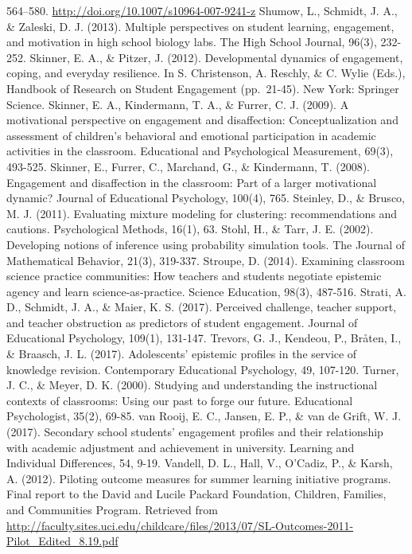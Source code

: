 \documentclass[]{msu-thesis}
\theoremstyle{definition}
\theoremstyle{definition}
\theoremstyle{definition}
\theoremstyle{remark}
\begin{document}
564--580. \url{http://doi.org/10.1007/s10964-007-9241-z} Shumow, L.,
Schmidt, J. A., \& Zaleski, D. J. (2013). Multiple perspectives on
student learning, engagement, and motivation in high school biology
labs. The High School Journal, 96(3), 232-252. Skinner, E. A., \&
Pitzer, J. (2012). Developmental dynamics of engagement, coping, and
everyday resilience. In S. Christenson, A. Reschly, \& C. Wylie (Eds.),
Handbook of Research on Student Engagement (pp.~21-45). New York:
Springer Science. Skinner, E. A., Kindermann, T. A., \& Furrer, C. J.
(2009). A motivational perspective on engagement and disaffection:
Conceptualization and assessment of children's behavioral and emotional
participation in academic activities in the classroom. Educational and
Psychological Measurement, 69(3), 493-525. Skinner, E., Furrer, C.,
Marchand, G., \& Kindermann, T. (2008). Engagement and disaffection in
the classroom: Part of a larger motivational dynamic? Journal of
Educational Psychology, 100(4), 765. Steinley, D., \& Brusco, M. J.
(2011). Evaluating mixture modeling for clustering: recommendations and
cautions. Psychological Methods, 16(1), 63. Stohl, H., \& Tarr, J. E.
(2002). Developing notions of inference using probability simulation
tools. The Journal of Mathematical Behavior, 21(3), 319-337. Stroupe, D.
(2014). Examining classroom science practice communities: How teachers
and students negotiate epistemic agency and learn science‐as‐practice.
Science Education, 98(3), 487-516. Strati, A. D., Schmidt, J. A., \&
Maier, K. S. (2017). Perceived challenge, teacher support, and teacher
obstruction as predictors of student engagement. Journal of Educational
Psychology, 109(1), 131-147. Trevors, G. J., Kendeou, P., Bråten, I., \&
Braasch, J. L. (2017). Adolescents' epistemic profiles in the service of
knowledge revision. Contemporary Educational Psychology, 49, 107-120.
Turner, J. C., \& Meyer, D. K. (2000). Studying and understanding the
instructional contexts of classrooms: Using our past to forge our
future. Educational Psychologist, 35(2), 69-85. van Rooij, E. C.,
Jansen, E. P., \& van de Grift, W. J. (2017). Secondary school students'
engagement profiles and their relationship with academic adjustment and
achievement in university. Learning and Individual Differences, 54,
9-19. Vandell, D. L., Hall, V., O'Cadiz, P., \& Karsh, A. (2012).
Piloting outcome measures for summer learning initiative programs. Final
report to the David and Lucile Packard Foundation, Children, Families,
and Communities Program. Retrieved from
\url{http://faculty.sites.uci.edu/childcare/files/2013/07/SL-Outcomes-2011-Pilot_Edited_8.19.pdf}
\end{document}
